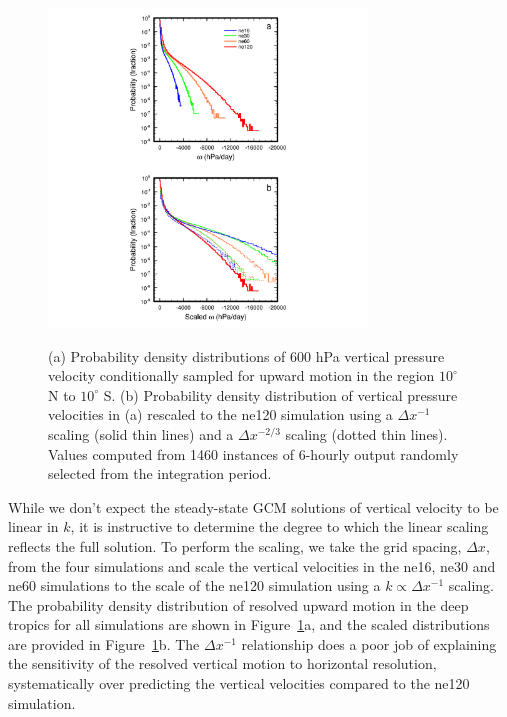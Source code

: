 \begin{figure}
\begin{center}
\noindent\includegraphics[width=20pc,angle=0]{chapter2/figure7.pdf}\\
\end{center}
\caption{(a) Probability density distributions of 600 hPa vertical pressure velocity conditionally sampled for upward motion in the region $10^{\circ}$ N to $10^{\circ}$ S. (b) Probability density distribution of vertical pressure velocities in (a) rescaled to the ne120 simulation using a $\Delta x^{-1}$ scaling (solid thin lines) and a $\Delta x^{-2/3}$ scaling (dotted thin lines). Values computed from 1460 instances of 6-hourly output randomly selected from the integration period.}
\label{fig:figure2-7}
\end{figure}

While we don’t expect the steady-state GCM solutions of vertical velocity to be linear in $k$, it is instructive to determine the degree to which the linear scaling reflects the full solution. To perform the scaling, we take the grid spacing, $\Delta x$, from the four simulations and scale the vertical velocities in the ne16, ne30 and ne60 simulations to the scale of the ne120 simulation using a $k \propto \Delta x^{-1}$ scaling. The probability density distribution of resolved upward motion in the deep tropics for all simulations are shown in Figure~\ref{fig:figure2-7}a, and the scaled distributions are provided in Figure~\ref{fig:figure2-7}b. The $\Delta x^{-1}$ relationship does a poor job of explaining the sensitivity of the resolved vertical motion to horizontal resolution, systematically over predicting the vertical velocities compared to the ne120 simulation.


